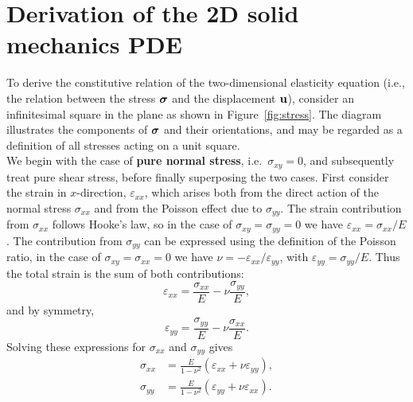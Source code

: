 \section{Derivation of the 2D solid mechanics PDE}
\label{sec:derivation_elasticity}

To derive the constitutive relation of the two-dimensional elasticity equation (i.e., the relation between the stress $\boldsymbol{\sigma}$ and the displacement $\mathbf{u}$), consider an infinitesimal square in the plane as shown in Figure~\ref{fig:stress}. The diagram illustrates the components of $\boldsymbol{\sigma}$ and their orientations, and may be regarded as a definition of all stresses acting on a unit square.\\
We begin with the case of \textbf{pure normal stress}, i.e.\ $\sigma_{xy}=0$, and subsequently treat pure shear stress, before finally superposing the two cases.  
First consider the strain in $x$-direction, $\varepsilon_{xx}$, which arises both from the direct action of the normal stress $\sigma_{xx}$ and from the Poisson effect due to $\sigma_{yy}$.  
The strain contribution from $\sigma_{xx}$ follows Hooke’s law, so in the case of $\sigma_{xy}=\sigma_{yy}=0$ we have $\varepsilon_{xx}=\sigma_{xx}/E$. The contribution from $\sigma_{yy}$ can be expressed using the definition of the Poisson ratio, in the case of $\sigma_{xy}=\sigma_{xx}=0$ we have $\nu=-\varepsilon_{xx}/\varepsilon_{yy}$, with $\varepsilon_{yy}=\sigma_{yy}/E$. Thus the total strain is the sum of both contributions:
\begin{equation*}
    \varepsilon_{xx} = \frac{\sigma_{xx}}{E} - \nu \frac{\sigma_{yy}}{E},
\end{equation*}
and by symmetry,
\begin{equation*}
    \varepsilon_{yy} = \frac{\sigma_{yy}}{E} - \nu \frac{\sigma_{xx}}{E}.
\end{equation*}
Solving these expressions for $\sigma_{xx}$ and $\sigma_{yy}$ gives
\begin{align*}
    \sigma_{xx} &= \frac{E}{1-\nu^2} \left(\varepsilon_{xx} + \nu \varepsilon_{yy}\right), \\
    \sigma_{yy} &= \frac{E}{1-\nu^2} \left(\varepsilon_{yy} + \nu \varepsilon_{xx}\right).
\end{align*}

